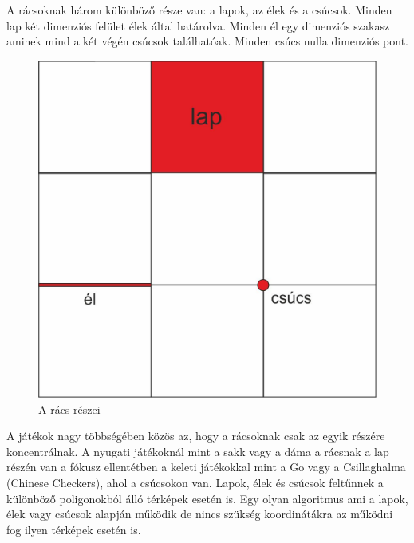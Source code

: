 A rácsoknak három különböző része van: a lapok, az élek és a csúcsok. Minden lap két dimenziós felület élek által határolva. Minden él egy dimenziós szakasz aminek mind a két végén csúcsok találhatóak. Minden csúcs nulla dimenziós pont. 

\begin{figure}[h!]
\centering
\includegraphics[scale=0.4]{kepek/PartsOfGrid.jpg}
\caption{A rács részei}
\label{fig:PartsOfGrid}
\end{figure}

\noindent A játékok nagy többségében közös az, hogy a rácsoknak csak az egyik részére koncentrálnak. A nyugati játékoknál mint a sakk vagy a dáma a rácsnak a lap részén van a fókusz ellentétben a keleti játékokkal mint a Go vagy a Csillaghalma (Chinese Checkers), ahol a csúcsokon van.
\newline
\newline Lapok, élek és csúcsok feltűnnek a különböző poligonokból álló  térképek esetén is. Egy olyan algoritmus ami a lapok, élek vagy csúcsok alapján működik de nincs szükség koordinátákra az működni fog ilyen térképek esetén is.


